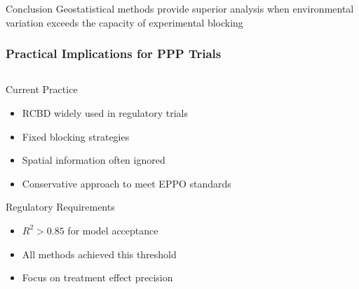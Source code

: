 \begin{frame}
    \vspace{1em}
    
    \begin{alertblock}{Conclusion}
        Geostatistical methods provide superior analysis when environmental variation exceeds the capacity of experimental blocking
    \end{alertblock}
\end{frame}

\begin{frame}
    \frametitle{Practical Implications for PPP Trials}
    
    \begin{columns}[T]
        \begin{column}{0.5\textwidth}
            \begin{block}{Current Practice}
                \begin{itemize}
                    \item RCBD widely used in regulatory trials
                    \item Fixed blocking strategies
                    \item Spatial information often ignored
                    \item Conservative approach to meet EPPO standards
                \end{itemize}
            \end{block}
            
            \begin{block}{Regulatory Requirements}
                \begin{itemize}
                    \item $R^2 > 0.85$ for model acceptance
                    \item All methods achieved this threshold
                    \item Focus on treatment effect precision
                \end{itemize}
            \end{block}
        \end{column}
        

\end{columns}
\end{frame}
